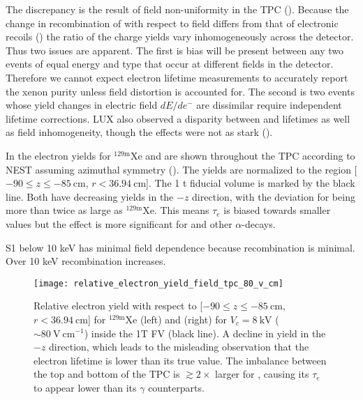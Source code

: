 The discrepancy is the result of field non-uniformity in the TPC ().  Because the change in recombination
of \alphadecays with respect to field differs from that of electronic recoils () the ratio
of the charge yields vary
inhomogeneously across the detector.  Thus two issues are apparent.  The first is bias will be present between any two events of equal
energy and type that occur at different fields in the detector.  Therefore we cannot expect electron lifetime measurements to accurately
report the xenon purity unless field distortion is accounted for.  The second is two events whose \electron yield changes in electric field
$dE/de^-$ are dissimilar require independent lifetime corrections.  LUX also observed a disparity between \metakr and 
lifetimes as well as field inhomogeneity, though the effects were not as stark ().

In  the electron yields for $\mathrm{^{129m}Xe}$ and 
are shown throughout the TPC according to NEST assuming azimuthal symmetry ().  The yields are normalized to the
region [$-90 \leq z \leq -85\ \mathrm{cm}$,
$r < 36.94\ \mathrm{cm}$].  The 1 t fiducial volume is marked by the black line.  Both have decreasing yields in the $-z$ direction,
with the deviation for  being more than twice as large as $\mathrm{^{129m}Xe}$.  This means $\tau_e$ is biased towards
smaller values but the effect is more significant for  and other $\alpha$-decays.

S1 below 10 keV has minimal field dependence because recombination is minimal.  Over 10 keV recombination increases.

\begin{figure}
\centering
\texttt{[image: relative\_electron\_yield\_field\_tpc\_80\_v\_cm]}
\caption{Relative electron yield with respect to [$-90 \leq z \leq -85\ \mathrm{cm}$, $r < 36.94\ \mathrm{cm}$] for
$\mathrm{^{129m}Xe}$ (left) and  (right) for $V_c = 8\ \mathrm{kV}$ (${\sim}80\ \mathrm{V\ cm^{-1}}$) inside the 1T FV (black
line).  A decline in yield in the $-z$ direction, which leads to the misleading observation that the electron lifetime is lower than its
true value.  The imbalance between the top
and bottom of the TPC is $\gtrsim 2\times$ larger for , causing its $\tau_e$ to appear lower than its $\gamma$ counterparts.}
\label{fig:electron_lifetimes_rn222_vs_kr83m_field_tpc}
\end{figure}

